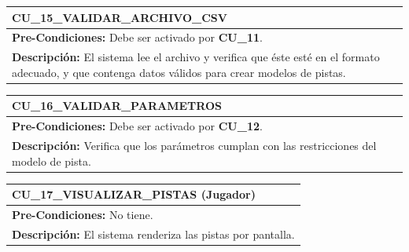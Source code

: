 \begin{center}
  \begin{tabular}{| p{7.5cm} | p{7.5cm} |}
    \hline
    \multicolumn{2}{|p{15cm}|}{\textbf{CU\_15\_VALIDAR\_ARCHIVO\_CSV}} \\ \hline
    \multicolumn{2}{|p{15cm}|}{\textbf{Pre-Condiciones:} Debe ser activado por \textbf{CU\_11}.} \\ \hline
    \multicolumn{2}{|p{15cm}|}{\textbf{Descripción:} El sistema lee el archivo y verifica que éste esté en el formato adecuado, y que contenga datos válidos para crear modelos de pistas.} \\
    \hline
  \end{tabular}
\end{center}

\begin{center}
  \begin{tabular}{| p{7.5cm} | p{7.5cm} |}
    \hline
    \multicolumn{2}{|p{15cm}|}{\textbf{CU\_16\_VALIDAR\_PARAMETROS}} \\ \hline
    \multicolumn{2}{|p{15cm}|}{\textbf{Pre-Condiciones:} Debe ser activado por \textbf{CU\_12}.} \\ \hline
    \multicolumn{2}{|p{15cm}|}{\textbf{Descripción:} Verifica que los parámetros cumplan con las restricciones del modelo de pista.} \\
    \hline
  \end{tabular}
\end{center}

\begin{center}
  \begin{tabular}{| p{7.5cm} | p{7.5cm} |}
    \hline
    \multicolumn{2}{|p{15cm}|}{\textbf{CU\_17\_VISUALIZAR\_PISTAS} (Jugador)} \\ \hline
    \multicolumn{2}{|p{15cm}|}{\textbf{Pre-Condiciones:} No tiene.} \\ \hline
    \multicolumn{2}{|p{15cm}|}{\textbf{Descripción:} El sistema renderiza las pistas por pantalla.} \\
    \hline
  \end{tabular}
\end{center}


